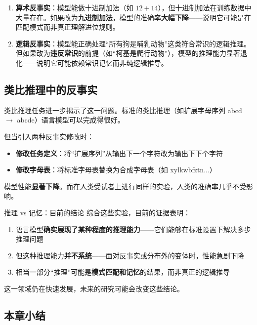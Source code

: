 \documentclass[a4paper]{article}
\begin{document}
\begin{enumerate}
    \item \textbf{算术反事实}：模型能做十进制加法（如 $12 + 14$），但十进制加法在训练数据中大量存在。如果改为\textbf{九进制加法}，模型的准确率\textbf{大幅下降}——说明它可能是在匹配模式而非真正理解进位规则。
    \item \textbf{逻辑反事实}：模型能正确处理``所有狗是哺乳动物''这类符合常识的逻辑推理。但如果改为\textbf{违反常识}的前提（如``柯基是爬行动物''），模型的推理能力显著退化——说明它可能依赖常识记忆而非纯逻辑推导。
\end{enumerate}

\subsection{类比推理中的反事实}

类比推理任务进一步揭示了这一问题。标准的类比推理（如扩展字母序列 abcd $\rightarrow$ abcde）语言模型可以完成得很好。




但当引入两种反事实修改时：

\begin{itemize}
    \item \textbf{修改任务定义}：将``扩展序列''从输出下一个字符改为输出下下个字符
    \item \textbf{修改字母表}：将标准字母表替换为合成字母表（如 xylkwbfztn...）
\end{itemize}

模型性能\textbf{显著下降}。而在人类受试者上进行同样的实验，人类的准确率几乎不受影响。

\begin{importantbox}{推理 vs 记忆：目前的结论}
综合这些实验，目前的证据表明：
\begin{enumerate}
    \item 语言模型\textbf{确实展现了某种程度的推理能力}——它们能够在标准设置下解决多步推理问题
    \item 但这种推理能力\textbf{并不系统}——面对反事实或分布外的变体时，性能急剧下降
    \item 相当一部分``推理''可能是\textbf{模式匹配和记忆}的结果，而非真正的逻辑推导
\end{enumerate}
这一领域仍在快速发展，未来的研究可能会改变这些结论。
\end{importantbox}

\subsection{本章小结}
\end{document}
